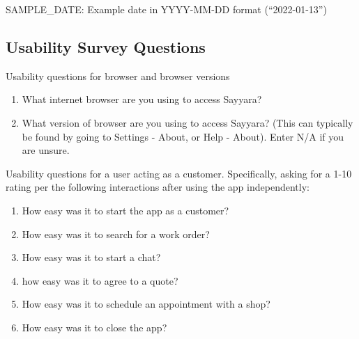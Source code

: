 \documentclass[12pt, titlepage]{article}
\begin{document}
SAMPLE\_DATE: Example date in YYYY-MM-DD format (``2022-01-13'')\\

\subsection{Usability Survey Questions}

Usability questions for browser and browser versions
\begin{enumerate}
    \item What internet browser are you using to access Sayyara?
    \item What version of browser are you using to access Sayyara? (This can typically be found by going to Settings -\> About, or Help -\> About). Enter N/A if you are unsure.
\end{enumerate}


Usability questions for a user acting as a customer. Specifically, asking for a 1-10 rating per the following interactions after using the app independently:
\begin{enumerate}
    \item How easy was it to start the app as a customer?
    \item How easy was it to search for a work order?
    \item How easy was it to start a chat?
    \item how easy was it to agree to a quote?
    \item How easy was it to schedule an appointment with a shop?
    \item How easy was it to close the app?
\end{enumerate}
\end{document}
